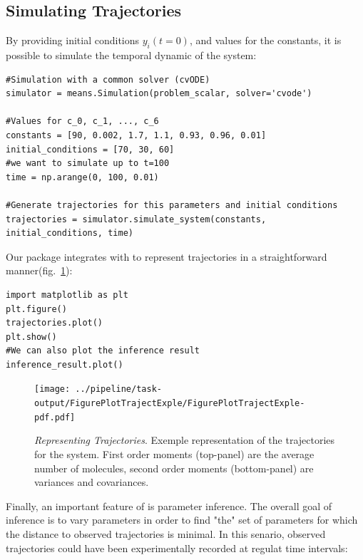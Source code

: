 \subsection{Simulating Trajectories}
By providing initial conditions $y_i(t=0)$, and values for the constants, it is possible to simulate the temporal dynamic of the system:



\begin{framed}
\begin{verbatim}
#Simulation with a common solver (cvODE)
simulator = means.Simulation(problem_scalar, solver='cvode')

#Values for c_0, c_1, ..., c_6
constants = [90, 0.002, 1.7, 1.1, 0.93, 0.96, 0.01]
initial_conditions = [70, 30, 60]
#we want to simulate up to t=100
time = np.arange(0, 100, 0.01)

#Generate trajectories for this parameters and initial conditions
trajectories = simulator.simulate_system(constants, initial_conditions, time)
\end{verbatim}
\end{framed}


Our package integrates with \plt{} to represent trajectories in a straightforward manner(fig.~\ref{fig:trajectories_exple}):

\begin{framed}
\begin{verbatim}
import matplotlib as plt
plt.figure()
trajectories.plot()
plt.show()
#We can also plot the inference result
inference_result.plot()
\end{verbatim}
\end{framed}

\begin{figure}
\texttt{[image: ../pipeline/task-output/FigurePlotTrajectExple/FigurePlotTrajectExple-pdf.pdf]}

\caption{\emph{Representing Trajectories}.
Exemple representation of the trajectories for the \pft{} system.
First order moments (top-panel) are the average number of molecules, second order moments (bottom-panel) are variances and covariances.
}
\label{fig:trajectories_exple}
\end{figure}


Finally, an important feature of \means{} is parameter inference.
The overall goal of inference is to vary parameters in order to find "the" set of parameters for which the distance to observed trajectories is minimal.
In this senario, observed trajectories could have been experimentally recorded at regulat time intervals:

